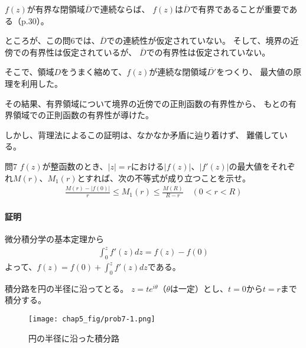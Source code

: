 $f(z)$が有界な閉領域$\overline{D}$で連続ならば、
$f(z)$は$\overline{D}$で有界であることが重要である（p.30）。

ところが、この問6では、$\overline{D}$での連続性が仮定されていない。
そして、境界の近傍での有界性は仮定されているが、
$\overline{D}$での有界性は仮定されていない。

そこで、領域$D$をうまく縮めて、$f(z)$が連続な閉領域$\overline{D'}$をつくり、
最大値の原理を利用した。

その結果、有界領域について境界の近傍での正則函数の有界性から、
もとの有界領域での正則函数の有界性が導けた。

しかし、背理法によるこの証明は、なかなか矛盾に辿り着けず、
難儀している。

%
%
%
%
%

\begin{mysimplebox}{問7}
    $f(z)$が整函数のとき、$|z|=r$における$|f(z)|$、$|f'(z)|$の最大値をそれぞれ$M(r)$、$M_1(r)$とすれば、次の不等式が成り立つことを示せ。
    \begin{align*}
        \frac{M(r)-|f(0)|}{r}\le M_1(r)\le\frac{M(R)}{R-r}
        \quad(0<r<R)
    \end{align*}
\end{mysimplebox}
\paragraph{証明}
微分積分学の基本定理から
\begin{align*}
    \int_{0}^{z}f'(z)dz=f(z)-f(0)
\end{align*}
よって、$f(z)=f(0)+\int_{0}^{z}f'(z)dz$である。

積分路を円の半径に沿ってとる。
$z=te^{i\theta}$（$\theta$は一定）とし、$t=0$から$t=r$まで積分する。

\begin{figure}[h]
    \centering
    \texttt{[image: chap5\_fig/prob7-1.png]}
    \caption{円の半径に沿った積分路}
    \label{fig:chap5-7-1}
\end{figure}

